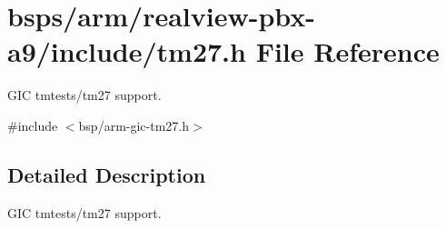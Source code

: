 \hypertarget{arm_2realview-pbx-a9_2include_2tm27_8h}{}\section{bsps/arm/realview-\/pbx-\/a9/include/tm27.h File Reference}
\label{arm_2realview-pbx-a9_2include_2tm27_8h}


G\+IC tmtests/tm27 support.  


{\ttfamily \#include $<$bsp/arm-\/gic-\/tm27.\+h$>$}\newline


\subsection{Detailed Description}
G\+IC tmtests/tm27 support. 

